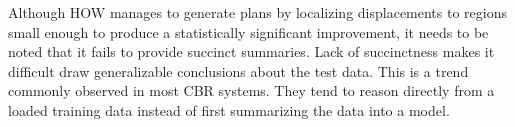 \documentclass{sig-alternate}
\begin{document}
Although HOW manages to generate plans by localizing displacements to regions small enough to produce a statistically significant improvement, it needs to be noted that it fails to provide succinct summaries. Lack of succinctness makes it difficult draw generalizable conclusions about the test data. This is a trend commonly observed in most CBR systems. They tend to reason directly from a loaded training data instead of first summarizing the data into a model. 

\end{document}
